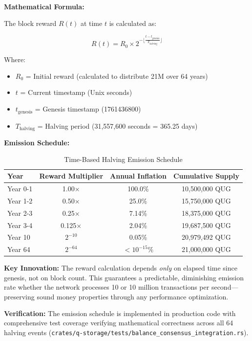 \documentclass[11pt,a4paper]{scrartcl}
\begin{document}
\textbf{Mathematical Formula:}

The block reward $R(t)$ at time $t$ is calculated as:

\[
R(t) = R_0 \times 2^{-\lfloor \frac{t - t_{\text{genesis}}}{T_{\text{halving}}} \rfloor}
\]

Where:
\begin{itemize}
\item $R_0$ = Initial reward (calculated to distribute 21M over 64 years)
\item $t$ = Current timestamp (Unix seconds)
\item $t_{\text{genesis}}$ = Genesis timestamp (1761436800)
\item $T_{\text{halving}}$ = Halving period (31,557,600 seconds = 365.25 days)
\end{itemize}

\textbf{Emission Schedule:}

\begin{table}[h]
\centering
\begin{tabular}{lccc}
\toprule
\textbf{Year} & \textbf{Reward Multiplier} & \textbf{Annual Inflation} & \textbf{Cumulative Supply} \\
\midrule
Year 0-1 & 1.00× & 100.0\% & 10,500,000 QUG \\
Year 1-2 & 0.50× & 25.0\% & 15,750,000 QUG \\
Year 2-3 & 0.25× & 7.14\% & 18,375,000 QUG \\
Year 3-4 & 0.125× & 2.04\% & 19,687,500 QUG \\
Year 10 & $2^{-10}$ & 0.05\% & 20,979,492 QUG \\
Year 64 & $2^{-64}$ & $<10^{-15}\%$ & 21,000,000 QUG \\
\bottomrule
\end{tabular}
\caption{Time-Based Halving Emission Schedule}
\end{table}

\textbf{Key Innovation:} The reward calculation depends \textit{only} on elapsed time since genesis, not on block count. This guarantees a predictable, diminishing emission rate whether the network processes 10 or 10 million transactions per second—preserving sound money properties through any performance optimization.

\textbf{Verification:} The emission schedule is implemented in production code with comprehensive test coverage verifying mathematical correctness across all 64 halving events (\texttt{crates/q-storage/tests/balance\_consensus\_integration.rs}).
\end{document}
